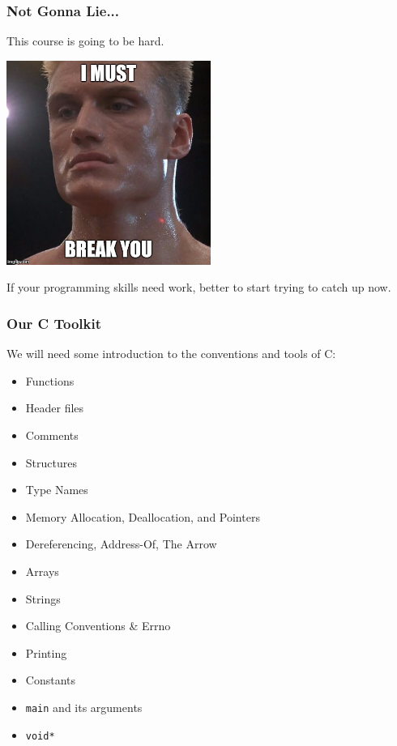\begin{frame}
	\frametitle{Not Gonna Lie...}

	This course is going to be hard.

	\begin{center}
		\includegraphics[width=0.5\textwidth]{images/drago.jpg}
	\end{center}

	If your programming skills need work, better to start trying to catch up now.

\end{frame}


\begin{frame}
	\frametitle{Our C Toolkit}

	We will need some introduction to the conventions and tools of C:
	\begin{itemize}
		\item Functions
		\item Header files
		\item Comments
		\item Structures
		\item Type Names
		\item Memory Allocation, Deallocation, and Pointers
		\item Dereferencing, Address-Of, The Arrow
		\item Arrays
		\item Strings
		\item Calling Conventions \& Errno
		\item Printing
		\item Constants
		\item \texttt{main} and its arguments
		\item \texttt{void*}
	\end{itemize}


\end{frame}






